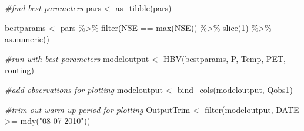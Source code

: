 \documentclass[
]{book}
\newenvironment{Shaded}{\begin{snugshade}}{\end{snugshade}}
\newcommand{\CommentTok}[1]{\textcolor[rgb]{0.56,0.35,0.01}{\textit{#1}}}
\newcommand{\DecValTok}[1]{\textcolor[rgb]{0.00,0.00,0.81}{#1}}
\newcommand{\FunctionTok}[1]{\textcolor[rgb]{0.00,0.00,0.00}{#1}}
\newcommand{\NormalTok}[1]{#1}
\newcommand{\OtherTok}[1]{\textcolor[rgb]{0.56,0.35,0.01}{#1}}
\newcommand{\SpecialCharTok}[1]{\textcolor[rgb]{0.00,0.00,0.00}{#1}}
\newcommand{\StringTok}[1]{\textcolor[rgb]{0.31,0.60,0.02}{#1}}
\begin{document}
\begin{Shaded}
\begin{Highlighting}[]
\CommentTok{\#find best parameters}
\NormalTok{pars }\OtherTok{\textless{}{-}} \FunctionTok{as\_tibble}\NormalTok{(pars)}

\NormalTok{bestparams }\OtherTok{\textless{}{-}}\NormalTok{ pars }\SpecialCharTok{\%\textgreater{}\%} \FunctionTok{filter}\NormalTok{(NSE }\SpecialCharTok{==} \FunctionTok{max}\NormalTok{(NSE)) }\SpecialCharTok{\%\textgreater{}\%}
                        \FunctionTok{slice}\NormalTok{(}\DecValTok{1}\NormalTok{) }\SpecialCharTok{\%\textgreater{}\%}
                        \FunctionTok{as.numeric}\NormalTok{()}

\CommentTok{\#run with best parameters}
\NormalTok{modeloutput }\OtherTok{\textless{}{-}}  \FunctionTok{HBV}\NormalTok{(bestparams, P, Temp, PET, routing)}

\CommentTok{\#add observations for plotting}
\NormalTok{modeloutput }\OtherTok{\textless{}{-}} \FunctionTok{bind\_cols}\NormalTok{(modeloutput, Qobs1)}

\CommentTok{\#trim out warm up period for plotting}
\NormalTok{OutputTrim }\OtherTok{\textless{}{-}} \FunctionTok{filter}\NormalTok{(modeloutput, DATE }\SpecialCharTok{\textgreater{}=} \FunctionTok{mdy}\NormalTok{(}\StringTok{"08{-}07{-}2010"}\NormalTok{))}
\end{Highlighting}
\end{Shaded}
\end{document}
